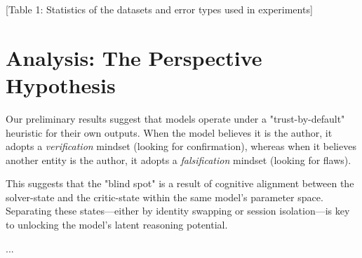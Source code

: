 \documentclass[11pt]{article}
\begin{document}
[Table 1: Statistics of the datasets and error types used in experiments]

\section{Analysis: The Perspective Hypothesis}
\label{sec:analysis}

Our preliminary results suggest that models operate under a "trust-by-default" heuristic for their own outputs. When the model believes it is the author, it adopts a \emph{verification} mindset (looking for confirmation), whereas when it believes another entity is the author, it adopts a \emph{falsification} mindset (looking for flaws). 

This suggests that the "blind spot" is a result of cognitive alignment between the solver-state and the critic-state within the same model's parameter space. Separating these states—either by identity swapping or session isolation—is key to unlocking the model's latent reasoning potential.

...
\end{document}

